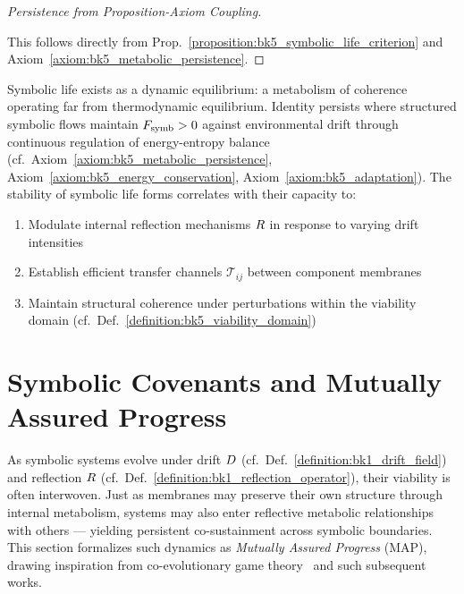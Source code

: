 \begin{proof}[Persistence from Proposition-Axiom Coupling]
\label{proof:bk5_proposition_axiom_coupling}
\leavevmode

This follows directly from
Prop.~\ref{proposition:bk5_symbolic_life_criterion} and
Axiom~\ref{axiom:bk5_metabolic_persistence}.
\end{proof}

\begin{scholium}
\label{scholium:bk5_symbolic_life}
Symbolic life exists as a dynamic equilibrium: a metabolism of coherence operating far from thermodynamic equilibrium. Identity persists where structured symbolic flows maintain $F_{\mathrm{symb}} > 0$ against environmental drift through continuous regulation of energy-entropy balance (cf.~Axiom~\ref{axiom:bk5_metabolic_persistence}, Axiom~\ref{axiom:bk5_energy_conservation}, Axiom~\ref{axiom:bk5_adaptation}).
The stability of symbolic life forms correlates with their capacity to:
\begin{enumerate}
  \item Modulate internal reflection mechanisms $R$ in response to varying drift intensities
  \item Establish efficient transfer channels $\mathcal{T}_{ij}$ between component membranes
  \item Maintain structural coherence under perturbations within the viability domain (cf.~Def.~\ref{definition:bk5_viability_domain})
\end{enumerate}
\end{scholium}

\section{Symbolic Covenants and Mutually Assured Progress}
\label{sec:bk5_symbolic_covenants_and_mutually_assured_progress}

As symbolic systems evolve under drift $D$ (cf.~Def.~\ref{definition:bk1_drift_field}) and reflection $R$ (cf.~Def.~\ref{definition:bk1_reflection_operator}), their viability is often interwoven. Just as membranes may preserve their own structure through internal metabolism, systems may also enter reflective metabolic relationships with others — yielding persistent co-sustainment across symbolic boundaries. This section formalizes such dynamics as \emph{Mutually Assured Progress} (MAP), drawing inspiration from co-evolutionary game theory~\cite{maynard1982evolution} and such subsequent works.

